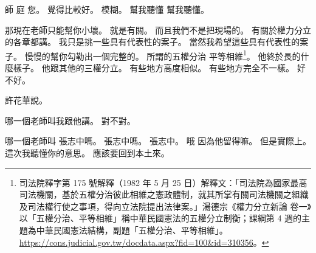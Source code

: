 \hypertarget{c01:cue:2649}{}師 庭 您。
\hypertarget{c01:cue:2650}{}覺得比較好。
\hypertarget{c01:cue:2651}{}模糊。
\hypertarget{c01:cue:2652}{}幫我聽懂 幫我聽懂。

\hypertarget{c01:cue:2653}{}那現在老師只能幫你小壞。
\hypertarget{c01:cue:2654}{}就是有關。
\hypertarget{c01:cue:2655}{}而且我們不是把現場的。
\hypertarget{c01:cue:2656}{}有關於權力分立的各章都講。
\hypertarget{c01:cue:2657}{}我只是挑一些具有代表性的案子。
\hypertarget{c01:cue:2658}{}當然我希望這些具有代表性的案子。
\hypertarget{c01:cue:2659}{}慢慢的幫你勾勒出一個完整的。
\hypertarget{c01:cue:2660}{}所謂的五權分治 平等相維\footnote{司法院釋字第 175 號解釋（1982 年 5 月 25 日）解釋文：「司法院為國家最高司法機關，基於五權分治彼此相維之憲政體制，就其所掌有關司法機關之組織及司法權行使之事項，得向立法院提出法律案。」湯德宗《權力分立新論 卷一》以「五權分治、平等相維」稱中華民國憲法的五權分立制衡；課綱第 4 週的主題為中華民國憲法結構，副題「五權分治、平等相維」。\url{https://cons.judicial.gov.tw/docdata.aspx?fid=100&id=310356}。}。
\hypertarget{c01:cue:2661}{}他終於長的什麼樣子。
\hypertarget{c01:cue:2662}{}他跟其他的三權分立。
\hypertarget{c01:cue:2663}{}有些地方高度相似。
\hypertarget{c01:cue:2664}{}有些地方完全不一樣。
\hypertarget{c01:cue:2665}{}好不好。

\hypertarget{c01:cue:2666}{}許花華說。

\hypertarget{c01:cue:2667}{}哪一個老師叫我跟他講。
\hypertarget{c01:cue:2668}{}對不對。

\hypertarget{c01:cue:2669}{}哪一個老師叫 張志中嗎。
\hypertarget{c01:cue:2670}{}張志中嗎。
\hypertarget{c01:cue:2671}{}張志中。
\hypertarget{c01:cue:2672}{}哦 因為他留得嘛。
\hypertarget{c01:cue:2673}{}但是實際上。
\hypertarget{c01:cue:2674}{}這次我聽懂你的意思。
\hypertarget{c01:cue:2675}{}應該要回到本土來。

